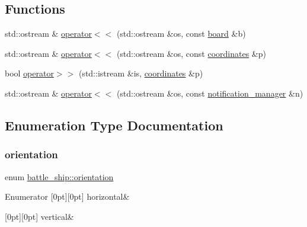 \subsection*{Functions}
\begin{DoxyCompactItemize}
\item 
std\+::ostream \& \hyperlink{namespacebattle__ship_a8f319aebd93115655c5cfd648a988e01}{operator$<$$<$} (std\+::ostream \&os, const \hyperlink{classbattle__ship_1_1board}{board} \&b)
\item 
std\+::ostream \& \hyperlink{namespacebattle__ship_ac73c2d37116f5d6ed25e71eef5c37dc8}{operator$<$$<$} (std\+::ostream \&os, const \hyperlink{structbattle__ship_1_1coordinates}{coordinates} \&p)
\item 
bool \hyperlink{namespacebattle__ship_ab0747cf7357f5f11e76979fdf9757861}{operator$>$$>$} (std\+::istream \&is, \hyperlink{structbattle__ship_1_1coordinates}{coordinates} \&p)
\item 
std\+::ostream \& \hyperlink{namespacebattle__ship_a1a93528abeff933fb4839aa528313c51}{operator$<$$<$} (std\+::ostream \&os, const \hyperlink{classbattle__ship_1_1notification__manager}{notification\+\_\+manager} \&n)
\end{DoxyCompactItemize}


\subsection{Enumeration Type Documentation}
\mbox{\label{namespacebattle__ship_aed87488f0a73f0d0679fe343fb61c784}} 
\subsubsection{\texorpdfstring{orientation}{orientation}}
{\footnotesize\ttfamily enum \hyperlink{namespacebattle__ship_aed87488f0a73f0d0679fe343fb61c784}{battle\+\_\+ship\+::orientation}\hspace{0.3cm}{\ttfamily [strong]}}

\begin{DoxyEnumFields}{Enumerator}
[0pt][0pt]{}\mbox{\label{namespacebattle__ship_aed87488f0a73f0d0679fe343fb61c784a4505cad087312551a6fbbe6ebe163e0f}} 
horizontal&\\
\hline

[0pt][0pt]{}\mbox{\label{namespacebattle__ship_aed87488f0a73f0d0679fe343fb61c784ae6dec152d6a941fccb0a5e8cc2579cc3}} 
vertical&\\
\hline

\end{DoxyEnumFields}


